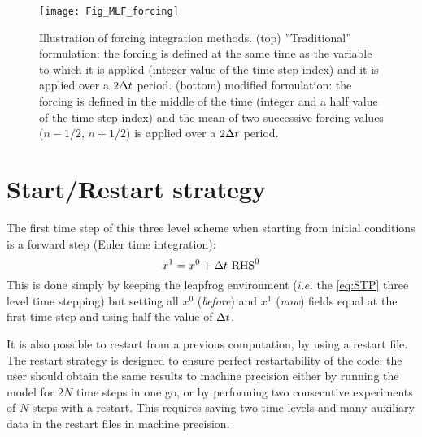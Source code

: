 \documentclass[../main/NEMO_manual]{subfiles}
\begin{document}
\begin{figure}[!t]
  \begin{center}
    \texttt{[image: Fig\_MLF\_forcing]}
    \caption{
      \protect\label{fig:MLF_forcing}
      Illustration of forcing integration methods.
      (top) ''Traditional'' formulation:
      the forcing is defined at the same time as the variable to which it is applied
      (integer value of the time step index) and it is applied over a $2\Delta t$ period.
      (bottom)  modified formulation:
      the forcing is defined in the middle of the time (integer and a half value of the time step index) and
      the mean of two successive forcing values ($n-1/2$, $n+1/2$) is applied over a $2\Delta t$ period.
    }
  \end{center}
\end{figure}

\section{Start/Restart strategy}
\label{sec:STP_rst}


The first time step of this three level scheme when starting from initial conditions is a forward step
(Euler time integration):
\[
  x^1 = x^0 + \Delta t \ \text{RHS}^0
\]
This is done simply by keeping the leapfrog environment ($i.e.$ the \autoref{eq:STP} three level time stepping) but
setting all $x^0$ (\textit{before}) and $x^{1}$ (\textit{now}) fields equal at the first time step and
using half the value of $\Delta t$.

It is also possible to restart from a previous computation, by using a restart file.
The restart strategy is designed to ensure perfect restartability of the code:
the user should obtain the same results to machine precision either by
running the model for $2N$ time steps in one go,
or by performing two consecutive experiments of $N$ steps with a restart.
This requires saving two time levels and many auxiliary data in the restart files in machine precision. 
\end{document}
